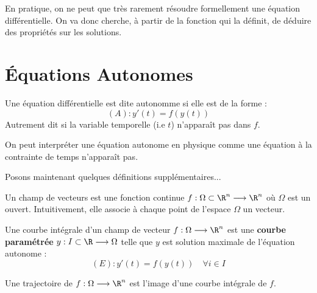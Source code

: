
En pratique, on ne peut que très rarement résoudre formellement une équation différentielle. 
On va donc cherche, à partir de la fonction qui la définit, de déduire des propriétés sur les solutions. 


\section{Équations Autonomes}

\begin{definition}
    Une équation différentielle est dite autonomme si elle est de la forme : 
        \[ (A) : y'(t) = f(y(t)) \] 
    Autrement dit si la variable temporelle (i.e $t$) n'apparaît pas dans $f$. 
\end{definition}

On peut interpréter une équation autonome en physique comme une équation à la contrainte de temps n'apparaît pas. 

Posons maintenant quelques définitions supplémentaires... 

\begin{definition}
    Un champ de vecteurs est une fonction continue $f : \Omega \subset \R^n \longrightarrow \R^n$ où $\Omega$ est un ouvert. 
    Intuitivement, elle associe à chaque point de l'espace $\Omega$ un vecteur. 
\end{definition}

\begin{definition}
    Une courbe intégrale d'un champ de vecteur $f : \Omega \longrightarrow \R^n$ est une \textbf{courbe paramétrée} 
    $y : I \subset \R \longrightarrow \Omega$ telle que $y$ est solution maximale de l'équation autonome :
        \[ (E) : y'(t) = f(y(t)) \quad \forall i \in I \] 
\end{definition}

\begin{definition}[Trajectoire]
    Une trajectoire de $f : \Omega \longrightarrow \R^n$ est l'image d'une courbe intégrale de $f$. 
\end{definition}

